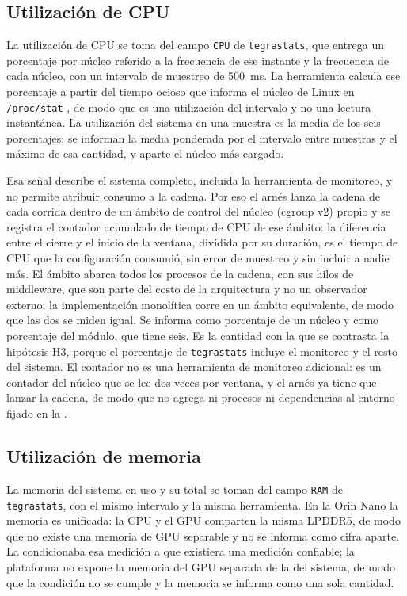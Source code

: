\subsection{Utilización de CPU}

La utilización de CPU se toma del campo \texttt{CPU} de \texttt{tegrastats},
que entrega un porcentaje por núcleo referido a la frecuencia de ese instante
y la frecuencia de cada núcleo, con un intervalo de muestreo de 500~ms. La
herramienta calcula ese porcentaje a partir del tiempo ocioso que informa el
núcleo de Linux en \texttt{/proc/stat} \cite{nvidiacorporation2026tegrastats},
de modo que es una utilización del intervalo y no una lectura instantánea.
La utilización del sistema en una muestra es la media de los seis
porcentajes; se informan la media ponderada por el intervalo entre muestras y
el máximo de esa cantidad, y aparte el núcleo más cargado.

Esa señal describe el sistema completo, incluida la herramienta de monitoreo,
y no permite atribuir consumo a la cadena. Por eso el arnés lanza la cadena de
cada corrida dentro de un ámbito de control del núcleo (cgroup v2)
\cite{linuxkernel2026cgroup} propio y se registra el contador acumulado de
tiempo de CPU de ese ámbito: la diferencia
entre el cierre y el inicio de la ventana, dividida por su duración, es el
tiempo de CPU que la configuración consumió, sin error de muestreo y sin
incluir a nadie más. El ámbito abarca todos los procesos de la cadena, con sus
hilos de middleware, que son parte del costo de la arquitectura y no un
observador externo; la implementación monolítica corre en un ámbito
equivalente, de modo que las dos se miden igual. Se informa como porcentaje de
un núcleo y como porcentaje del módulo, que tiene seis. Es la cantidad con la
que se contrasta la hipótesis H3, porque el porcentaje de \texttt{tegrastats}
incluye el monitoreo y el resto del sistema. El contador no es una herramienta
de monitoreo adicional: es un contador del núcleo que se lee dos veces por
ventana, y el arnés ya tiene que lanzar la cadena, de modo que no agrega ni
procesos ni dependencias al entorno fijado en la
.

\subsection{Utilización de memoria}

La memoria del sistema en uso y su total se toman del campo \texttt{RAM} de
\texttt{tegrastats}, con el mismo intervalo y la misma herramienta. En la Orin
Nano la memoria es unificada: la CPU y el GPU comparten la misma LPDDR5, de
modo que no existe una memoria de GPU separable y no se informa como cifra
aparte. La  condicionaba esa medición a que existiera una
medición confiable; la plataforma no expone la memoria del GPU separada de la
del sistema, de modo que la condición no se cumple y la memoria se informa
como una sola cantidad.

